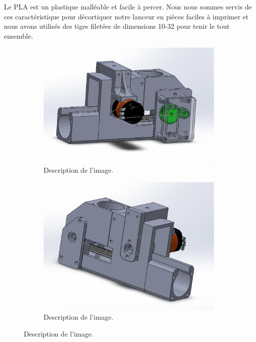 Le PLA est un plastique malléable et facile à percer.
Nous nous sommes servis de ces caractéristique pour décortiquer notre lanceur en pièces faciles à imprimer et nous avons utilisés des tiges filetées de dimensions 10-32 pour tenir le tout ensemble.

\begin{figure}[h!]
    \centering

    \begin{subfigure}{0.4\linewidth}
        \centering
        \includegraphics[width=\linewidth]{img/s2/cad/lanceur1}
        \caption{Description de l'image.}
        \label{fig:a1-s2-cad-lanceur1}
    \end{subfigure}
    \begin{subfigure}{0.4\linewidth}
        \centering
        \includegraphics[width=\linewidth]{img/s2/cad/lanceur2}
        \caption{Description de l'image.}
        \label{fig:a1-s2-cad-lanceur2}
    \end{subfigure}

    \caption{Description de l'image.}
    \label{fig:template-example-flottante}
\end{figure}

